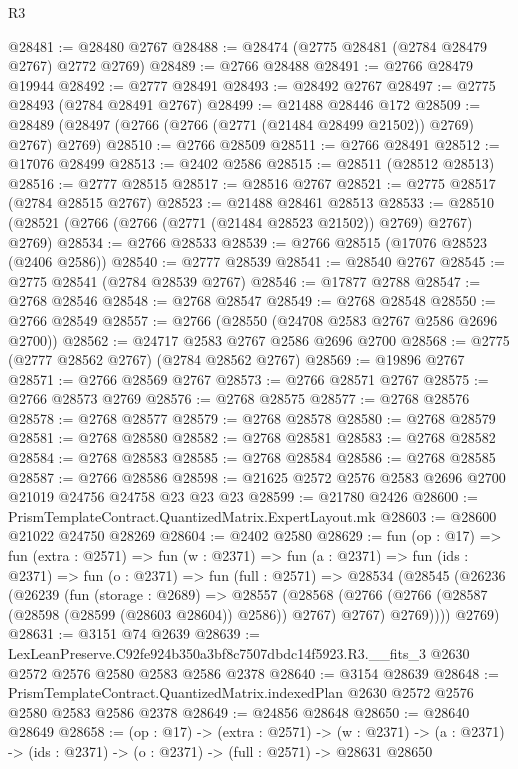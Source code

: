 \begin{lexlean}{R3}
\begin{coremodule}
@28481 := @28480 @2767
@28488 := @28474 (@2775 @28481 (@2784 @28479 @2767) @2772 @2769)
@28489 := @2766 @28488
@28491 := @2766 @28479 @19944
@28492 := @2777 @28491
@28493 := @28492 @2767
@28497 := @2775 @28493 (@2784 @28491 @2767)
@28499 := @21488 @28446 @172
@28509 := @28489 (@28497 (@2766 (@2766 (@2771 (@21484 @28499 @21502)) @2769) @2767) @2769)
@28510 := @2766 @28509
@28511 := @2766 @28491
@28512 := @17076 @28499
@28513 := @2402 @2586
@28515 := @28511 (@28512 @28513)
@28516 := @2777 @28515
@28517 := @28516 @2767
@28521 := @2775 @28517 (@2784 @28515 @2767)
@28523 := @21488 @28461 @28513
@28533 := @28510 (@28521 (@2766 (@2766 (@2771 (@21484 @28523 @21502)) @2769) @2767) @2769)
@28534 := @2766 @28533
@28539 := @2766 @28515 (@17076 @28523 (@2406 @2586))
@28540 := @2777 @28539
@28541 := @28540 @2767
@28545 := @2775 @28541 (@2784 @28539 @2767)
@28546 := @17877 @2788
@28547 := @2768 @28546
@28548 := @2768 @28547
@28549 := @2768 @28548
@28550 := @2766 @28549
@28557 := @2766 (@28550 (@24708 @2583 @2767 @2586 @2696 @2700))
@28562 := @24717 @2583 @2767 @2586 @2696 @2700
@28568 := @2775 (@2777 @28562 @2767) (@2784 @28562 @2767)
@28569 := @19896 @2767
@28571 := @2766 @28569 @2767
@28573 := @2766 @28571 @2767
@28575 := @2766 @28573 @2769
@28576 := @2768 @28575
@28577 := @2768 @28576
@28578 := @2768 @28577
@28579 := @2768 @28578
@28580 := @2768 @28579
@28581 := @2768 @28580
@28582 := @2768 @28581
@28583 := @2768 @28582
@28584 := @2768 @28583
@28585 := @2768 @28584
@28586 := @2768 @28585
@28587 := @2766 @28586
@28598 := @21625 @2572 @2576 @2583 @2696 @2700 @21019 @24756 @24758 @23 @23 @23
@28599 := @21780 @2426
@28600 := PrismTemplateContract.QuantizedMatrix.ExpertLayout.mk
@28603 := @28600 @21022 @24750 @28269
@28604 := @2402 @2580
@28629 := fun (op : @17) =>
  fun (extra : @2571) =>
  fun (w : @2371) =>
  fun (a : @2371) =>
  fun (ids : @2371) =>
  fun (o : @2371) =>
  fun (full : @2571) =>
  @28534
    (@28545
      (@26236
        (@26239
          (fun (storage : @2689) =>
          @28557
            (@28568
              (@2766 (@2766 (@28587 (@28598 (@28599 (@28603 @28604)) @2586)) @2767) @2767)
              @2769))))
      @2769)
@28631 := @3151 @74 @2639
@28639 := LexLeanPreserve.C92fe924b350a3bf8c7507dbdc14f5923.R3.__fits_3
    @2630
    @2572
    @2576
    @2580
    @2583
    @2586
    @2378
@28640 := @3154 @28639
@28648 := PrismTemplateContract.QuantizedMatrix.indexedPlan
    @2630
    @2572
    @2576
    @2580
    @2583
    @2586
    @2378
@28649 := @24856 @28648
@28650 := @28640 @28649
@28658 := (op : @17) ->
  (extra : @2571) ->
  (w : @2371) -> (a : @2371) -> (ids : @2371) -> (o : @2371) -> (full : @2571) -> @28631 @28650

\end{coremodule}
\end{lexlean}
